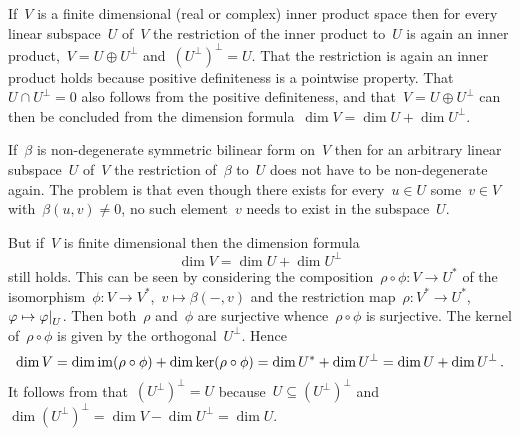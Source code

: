 \begin{recall}
  If~$V$ is a finite dimensional (real or complex) inner product space then for every linear subspace~$U$ of~$V$ the restriction of the inner product to~$U$ is again an inner product,~$V = U \oplus U^\perp$ and~$(U^\perp)^\perp = U$.
  That the restriction is again an inner product holds because positive definiteness is a pointwise property.
  That~$U \cap U^\perp = 0$ also follows from the positive definiteness, and that~$V = U \oplus U^\perp$ can then be concluded from the dimension formula~$\dim V = \dim U + \dim U^\perp$.
  
  If~$\beta$ is non-degenerate symmetric bilinear form on~$V$ then for an arbitrary linear subspace~$U$ of~$V$ the restriction of~$\beta$ to~$U$ does not have to be non-degenerate again.
  The problem is that even though there exists for every~$u \in U$ some~$v \in V$ with~$\beta(u,v) \neq 0$, no such element~$v$ needs to exist in the subspace~$U$.
  
  But if~$V$ is finite dimensional then the dimension formula
  \[
    \dim V
    =
    \dim U + \dim U^\perp
  \]
  still holds.
  This can be seen by considering the composition~$\rho \circ \phi \colon V \to U^*$ of the isomorphism~$\phi \colon V \to V^*$,~$v \mapsto \beta(-,v)$ and the restriction map~$\rho \colon V^* \to U^*$,~$\varphi \mapsto \restrict{\varphi}{U}$.
  Then both~$\rho$ and~$\phi$ are surjective whence~$\rho \circ \phi$ is surjective.
  The kernel of~$\rho \circ \phi$ is given by the orthogonal~$U^\perp$.
  Hence
  \[
    \dim V
    =
    \dim \operatorname{im} (\rho \circ \phi)
    +
    \dim \ker (\rho \circ \phi)
    =
    \dim U^* + \dim U^\perp
    =
    \dim U + \dim U^\perp \,.
  \]
  It follows from that~$(U^\perp)^\perp = U$ because~$U \subseteq (U^\perp)^\perp$ and~$\dim (U^\perp)^\perp = \dim V - \dim U^\perp = \dim U$.
  

\end{recall}
